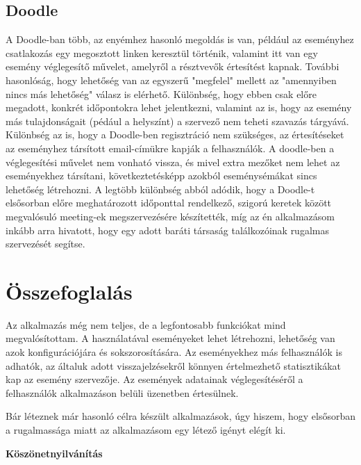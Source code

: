 \documentclass[a4paper,12pt]{report}
\theoremstyle{definition}
\theoremstyle{remark}
\begin{document}
\section{Doodle}

A Doodle-ban több, az enyémhez hasonló megoldás is van, például az eseményhez csatlakozás egy megosztott linken keresztül történik, valamint itt van egy esemény véglegesítő művelet, amelyről a résztvevők értesítést kapnak.  További hasonlóság, hogy lehetőség van az egyszerű "megfelel" mellett az "amennyiben nincs más lehetőség" válasz is elérhető. Különbség, hogy ebben csak előre megadott, konkrét időpontokra lehet jelentkezni, valamint az is, hogy az esemény más tulajdonságait (pédául a helyszínt) a szervező nem teheti szavazás tárgyává. Különbség az is, hogy a Doodle-ben regisztráció nem szükséges, az értesítéseket az eseményhez társított email-címükre kapják a felhasználók. A doodle-ben a véglegesítési művelet nem vonható vissza, és mivel extra mezőket nem lehet az eseményekhez társítani, következtetésképp azokból eseménysémákat sincs lehetőség létrehozni. A legtöbb különbség abból adódik, hogy a Doodle-t elsősorban előre meghatározott időponttal rendelkező, szigorú keretek között megvalósuló meeting-ek megszervezésére készítették, míg az én alkalmazásom inkább arra hivatott, hogy egy adott baráti társaság találkozóinak rugalmas szervezését segítse.

\chapter{Összefoglalás}

Az alkalmazás még nem teljes, de a legfontosabb funkciókat mind megvalósítottam. A használatával eseményeket lehet létrehozni, lehetőség van azok konfigurációjára és sokszorosítására. Az eseményekhez más felhasználók is adhatók, az általuk adott visszajelzésekről könnyen értelmezhető statisztikákat kap az esemény szervezője. Az események adatainak véglegesítéséről a felhasználók alkalmazáson belüli üzenetben értesülnek.

Bár léteznek már hasonló célra készült alkalmazások, úgy hiszem, hogy elsősorban a rugalmassága miatt az alkalmazásom egy létező igényt elégít ki.

\newpage


 

\newpage
{\Huge \bf Köszönetnyilvánítás}

\end{document}
